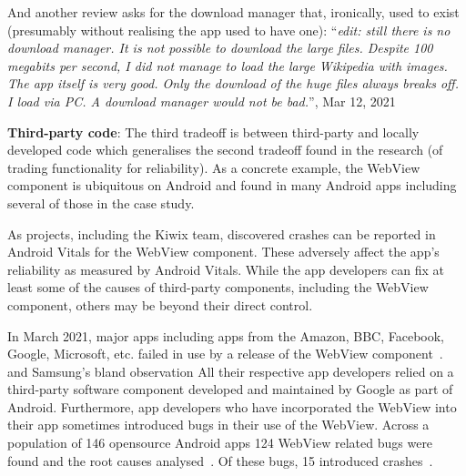 And another review asks for the download manager that, ironically, used to exist (presumably without realising the app used to have one): ``\textit{edit: still there is no download manager. It is not possible to download the large files. Despite 100 megabits per second, I did not manage to load the large Wikipedia with images. The app itself is very good. Only the download of the huge files always breaks off. I load via PC. A download manager would not be bad.}'', Mar 12, 2021 %

\textbf{Third-party code}: 
The third tradeoff is between third-party and locally developed code which generalises the second tradeoff found in the research (of trading functionality for reliability). As a concrete example, the WebView component is ubiquitous on Android and found in many Android apps including several of those in the case study. 


As projects, including the Kiwix team, discovered crashes can be reported in Android Vitals for the WebView component. These adversely affect the app's reliability as measured by Android Vitals. While the app developers can fix at least some of the causes of third-party components, including the WebView component, others may be beyond their direct control.

In March 2021, major apps including apps from the Amazon, BBC, Facebook, Google, Microsoft, etc. failed in use by a release of the WebView component~\citep{peters2021_google_fixes_issue_causing_android_apps_to_crash_etc_webview, bbcnews2021_google_fixes_crashing_android_app_issues, bbc_iplayer_app_april_2021_webview_information}. and Samsung's bland observation %
All their respective app developers relied on a third-party software component developed and maintained by Google as part of Android. Furthermore, app developers who have incorporated the WebView into their app sometimes introduced bugs in their use of the WebView. Across a population of 146 opensource Android apps 124 WebView related bugs were found and the root causes analysed~\citep[pp. 704 - 706]{hu2018_a_tale_of_two_cities_how_webview_introduces_bugs_to_android_applications}. Of these bugs, 15 introduced crashes~\citep[p. 706]{hu2018_a_tale_of_two_cities_how_webview_introduces_bugs_to_android_applications}.

